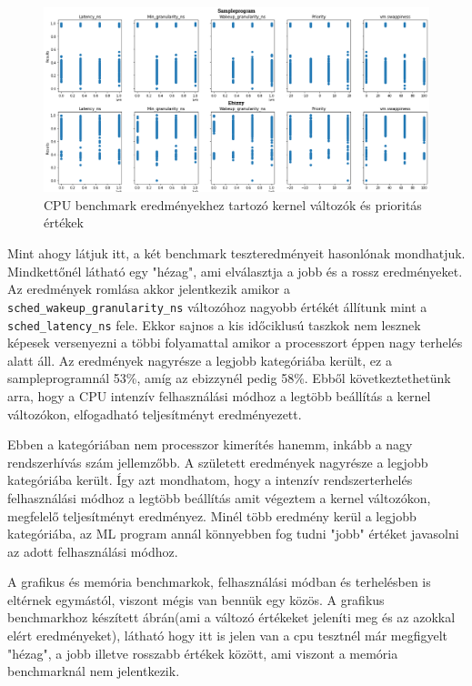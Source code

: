 \begin{figure}[h!]
\centering
\includegraphics[scale=0.35]{images/cpuBenchmarkValues.png}
\caption{CPU benchmark eredményekhez tartozó kernel változók és prioritás értékek}
\label{fig:CpuParameters}
\end{figure}

Mint ahogy látjuk itt, a két benchmark teszteredményeit hasonlónak mondhatjuk. Mindkettőnél látható egy "hézag", ami elválasztja a jobb és a rossz eredményeket. Az eredmények romlása akkor jelentkezik amikor a \texttt{sched\_wakeup\_granularity\_ns} változóhoz nagyobb értékét állítunk mint a \texttt{sched\_latency\_ns} fele. Ekkor sajnos a kis időciklusú taszkok nem lesznek képesek versenyezni a többi folyamattal amikor a processzort éppen nagy terhelés alatt áll.
Az eredmények nagyrésze a legjobb kategóriába került, ez a sampleprogramnál 53\%, amíg az ebizzynél pedig 58\%. Ebből következtethetünk arra, hogy a CPU intenzív felhasználási módhoz a legtöbb beállítás a kernel változókon, elfogadható teljesítményt eredményezett.

Ebben a kategóriában nem processzor kimerítés hanemm, inkább a nagy rendszerhívás szám jellemzőbb.
A született eredmények nagyrésze a legjobb kategóriába került. Így azt mondhatom, hogy a intenzív rendszerterhelés felhasználási módhoz a legtöbb beállítás amit végeztem a kernel változókon, megfelelő teljesítményt eredményez. Minél több eredmény kerül a legjobb kategóriába, az ML program annál könnyebben fog tudni "jobb" értéket javasolni az adott felhasználási módhoz.

A grafikus és memória benchmarkok, felhasználási módban és terhelésben is eltérnek egymástól, viszont mégis van bennük egy közös.
A grafikus benchmarkhoz készített ábrán(ami a változó értékeket jeleníti meg és az azokkal elért eredményeket), látható hogy itt is jelen van a cpu tesztnél már megfigyelt "hézag", a jobb illetve rosszabb értékek között, ami viszont a memória benchmarknál nem jelentkezik.

